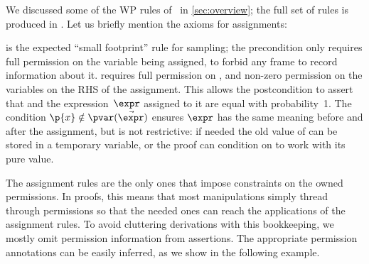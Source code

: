 We discussed some of the WP rules of \thelogic\ in \cref{sec:overview};
the full set of rules is produced in .
Let us briefly mention the axioms for assignments:
\begin{proofrules}\small
         \label{rule:wp-samp}

     \label{rule:wp-assign}
  \end{proofrules}
 is the expected ``small footprint'' rule for
sampling; the precondition only requires full permission on the variable
being assigned, to forbid any frame to record information about it.
 requires full permission on ,
and non-zero permission on the variables on the RHS of the assignment.
This allows the postcondition to assert that  and the expression~$\expr$
assigned to it are equal with probability~1.
The condition $\p{x} \notin \pvar(\vec{\expr})$ ensures $\expr$ has the same
meaning before and after the assignment, but is not restrictive:
if needed the old value of  can be stored in a temporary variable,
or the proof can condition on  to work with its pure value.


The assignment rules are the only ones that impose constraints on the owned
permissions.
In proofs, this means that most manipulations simply thread through permissions
so that the needed ones can reach the applications of the assignment rules.
To avoid cluttering derivations with this bookkeeping,
we mostly omit permission information from assertions.
The appropriate permission annotations can be easily inferred,
as we show in the following example.


